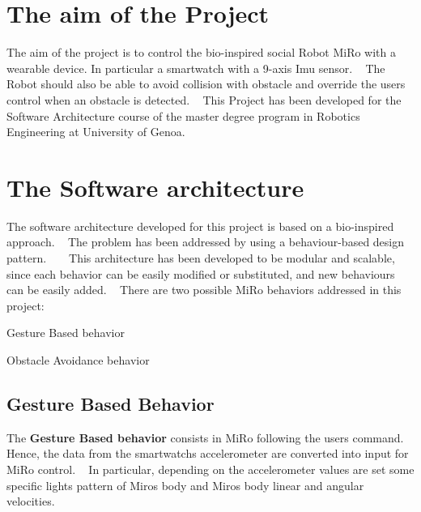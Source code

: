 \hypertarget{index_aim_sec}{}\section{The aim of the Project}\label{index_aim_sec}
The aim of the project is to control the bio-\/inspired social Robot Mi\+Ro with a wearable device. In particular a smartwatch with a 9-\/axis Imu sensor. ~\newline
 The Robot should also be able to avoid collision with obstacle and override the user\textquotesingle{}s control when an obstacle is detected. ~\newline
 This Project has been developed for the Software Architecture course of the master degree program in Robotics Engineering at University of Genoa. \hypertarget{index_sofar_sec}{}\section{The Software architecture}\label{index_sofar_sec}
The software architecture developed for this project is based on a bio-\/inspired approach. ~\newline
 The problem has been addressed by using a behaviour-\/based design pattern. ~\newline
 ~\newline
 This architecture has been developed to be modular and scalable, since each behavior can be easily modified or substituted, and new behaviours can be easily added. ~\newline
 There are two possible Mi\+Ro behaviors addressed in this project\+: 
\begin{DoxyItemize}
\item Gesture Based behavior 
\item Obstacle Avoidance behavior
\end{DoxyItemize}\hypertarget{index_gbb_sec}{}\subsection{Gesture Based Behavior}\label{index_gbb_sec}
The {\bfseries{Gesture Based behavior}} consists in Mi\+Ro following the user\textquotesingle{}s command. ~\newline
 Hence, the data from the smartwatch\textquotesingle{}s accelerometer are converted into input for Mi\+Ro control. ~\newline
 In particular, depending on the accelerometer values are set some specific lights pattern of Miro\textquotesingle{}s body and Miro\textquotesingle{}s body linear and angular velocities. ~\newline
